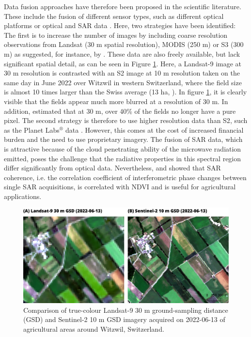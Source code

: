 Data fusion approaches have therefore been proposed in the scientific literature. These include the fusion of different sensor types, such as different optical platforms or optical and \gls{SAR} data \citep[for example]{pipia_fusing_2019, lobert_mowing_2021}. Here, two strategies have been identified: The first is to increase the number of images by including coarse resolution observations from Landsat (30 m spatial resolution), \gls{MODIS} (250 m) or \gls{S3} (300 m) as suggested, for instance, by \cite{zhou_reconstruction_2020}. These data are also freely available, but lack significant spatial detail, as can be seen in Figure \ref{fig:discussion-l9-vs-s2}. Here, a Landsat-9 image at 30 m resolution is contrasted with an S2 image at 10 m resolution taken on the same day in June 2022 over Witzwil in western Switzerland, where the field size is almost 10 times larger than the Swiss average (13 ha, \cite{perich_pixel-based_2023}). In figure \ref{fig:discussion-l9-vs-s2}, it is clearly visible that the fields appear much more blurred at a resolution of 30 m. In addition, \cite{meier_assessments_2020} estimated that at 30 m, over 40\% of the fields no longer have a pure pixel. The second strategy is therefore to use higher resolution data than \gls{S2}, such as the Planet Labs$^{\circledR}$ data \citep[for example]{sadeh_fusion_2021}. However, this comes at the cost of increased financial burden and the need to use proprietary imagery. The fusion of \gls{SAR} data, which is attractive because of the cloud penetrating ability of the microwave radiation emitted, poses the challenge that the radiative properties in this spectral region differ significantly from optical data. Nevertheless, \cite{bai_could_2020} and \cite{villarroya-carpio_sentinel-1_2022} showed that \gls{SAR} coherence, i.e. the correlation coefficient of interferometric phase changes between single \gls{SAR} acquisitions, is correlated with \gls{NDVI} and is useful for agricultural applications.

\begin{figure}[H]
    \centering
    \includegraphics[width=\textwidth]{07-Discussion/img/comparison_l9-s2_witzwil22.png}
    \caption{Comparison of true-colour Landsat-9 30 m ground-sampling distance (GSD) and Sentinel-2 10 m GSD imagery acquired on 2022-06-13 of agricultural areas around Witzwil, Switzerland.}
    \label{fig:discussion-l9-vs-s2}
\end{figure}

